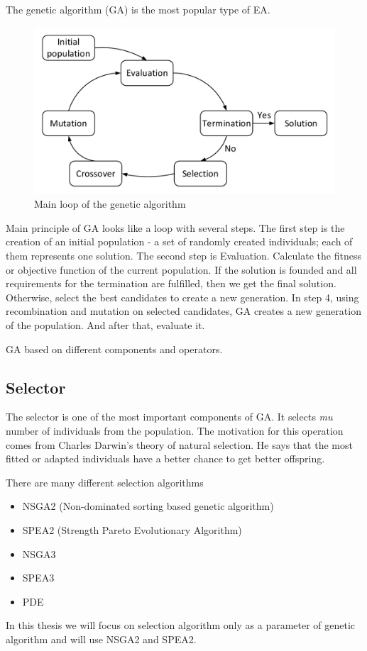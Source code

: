 The genetic algorithm (GA) is the most popular type of EA.

\begin{figure}
	\centering
	\includegraphics[width=\textwidth]{images/GeneticLoop}
	\caption{Main loop of the genetic algorithm}
	\label{fig:GeneticLoop}
\end{figure}
Main principle of GA looks like a loop with several steps.
The first step is the creation of an initial population - a set of randomly created individuals; each of them represents one solution. 
The second step is Evaluation. Calculate the fitness or objective function of the current population.
If the solution is founded and all requirements for the termination are fulfilled, then we get the final solution. Otherwise, select the best candidates to create a new generation.
In step 4, using recombination and mutation on selected candidates, GA creates a new generation of the population. And after that, evaluate it.

GA based on different components and operators.
\subsection{Selector}
The selector is one of the most important components of GA. It selects \textit{mu} number of individuals from the population. The motivation for this operation comes from Charles Darwin's theory of natural selection. He says that the most fitted or adapted individuals have a better chance to get better offspring.

There are many different selection algorithms
\begin{itemize}
	\item NSGA2 (Non-dominated sorting based genetic algorithm)
	\item SPEA2 (Strength Pareto Evolutionary Algorithm)
	\item NSGA3
	\item SPEA3
	\item PDE 
\end{itemize}
In this thesis we will focus on selection algorithm only as a parameter of genetic algorithm and will use NSGA2 and SPEA2. 
